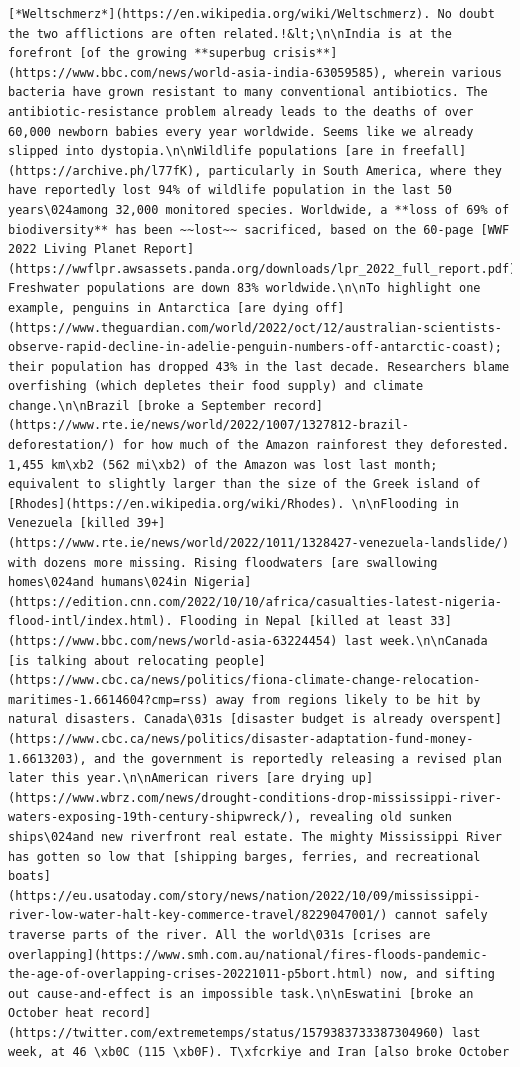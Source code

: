 \documentclass[
  letterpaper,
  DIV=11,
  numbers=noendperiod]{scrreprt}
\begin{document}
\begin{verbatim}
[*Weltschmerz*](https://en.wikipedia.org/wiki/Weltschmerz). No doubt the two afflictions are often related.!&lt;\n\nIndia is at the forefront [of the growing **superbug crisis**](https://www.bbc.com/news/world-asia-india-63059585), wherein various bacteria have grown resistant to many conventional antibiotics. The antibiotic-resistance problem already leads to the deaths of over 60,000 newborn babies every year worldwide. Seems like we already slipped into dystopia.\n\nWildlife populations [are in freefall](https://archive.ph/l77fK), particularly in South America, where they have reportedly lost 94% of wildlife population in the last 50 years\024among 32,000 monitored species. Worldwide, a **loss of 69% of biodiversity** has been ~~lost~~ sacrificed, based on the 60-page [WWF 2022 Living Planet Report](https://wwflpr.awsassets.panda.org/downloads/lpr_2022_full_report.pdf). Freshwater populations are down 83% worldwide.\n\nTo highlight one example, penguins in Antarctica [are dying off](https://www.theguardian.com/world/2022/oct/12/australian-scientists-observe-rapid-decline-in-adelie-penguin-numbers-off-antarctic-coast); their population has dropped 43% in the last decade. Researchers blame overfishing (which depletes their food supply) and climate change.\n\nBrazil [broke a September record](https://www.rte.ie/news/world/2022/1007/1327812-brazil-deforestation/) for how much of the Amazon rainforest they deforested. 1,455 km\xb2 (562 mi\xb2) of the Amazon was lost last month; equivalent to slightly larger than the size of the Greek island of [Rhodes](https://en.wikipedia.org/wiki/Rhodes). \n\nFlooding in Venezuela [killed 39+](https://www.rte.ie/news/world/2022/1011/1328427-venezuela-landslide/) with dozens more missing. Rising floodwaters [are swallowing homes\024and humans\024in Nigeria](https://edition.cnn.com/2022/10/10/africa/casualties-latest-nigeria-flood-intl/index.html). Flooding in Nepal [killed at least 33](https://www.bbc.com/news/world-asia-63224454) last week.\n\nCanada [is talking about relocating people](https://www.cbc.ca/news/politics/fiona-climate-change-relocation-maritimes-1.6614604?cmp=rss) away from regions likely to be hit by natural disasters. Canada\031s [disaster budget is already overspent](https://www.cbc.ca/news/politics/disaster-adaptation-fund-money-1.6613203), and the government is reportedly releasing a revised plan later this year.\n\nAmerican rivers [are drying up](https://www.wbrz.com/news/drought-conditions-drop-mississippi-river-waters-exposing-19th-century-shipwreck/), revealing old sunken ships\024and new riverfront real estate. The mighty Mississippi River has gotten so low that [shipping barges, ferries, and recreational boats](https://eu.usatoday.com/story/news/nation/2022/10/09/mississippi-river-low-water-halt-key-commerce-travel/8229047001/) cannot safely traverse parts of the river. All the world\031s [crises are overlapping](https://www.smh.com.au/national/fires-floods-pandemic-the-age-of-overlapping-crises-20221011-p5bort.html) now, and sifting out cause-and-effect is an impossible task.\n\nEswatini [broke an October heat record](https://twitter.com/extremetemps/status/1579383733387304960) last week, at 46 \xb0C (115 \xb0F). T\xfcrkiye and Iran [also broke October 
\end{verbatim}
\end{document}
